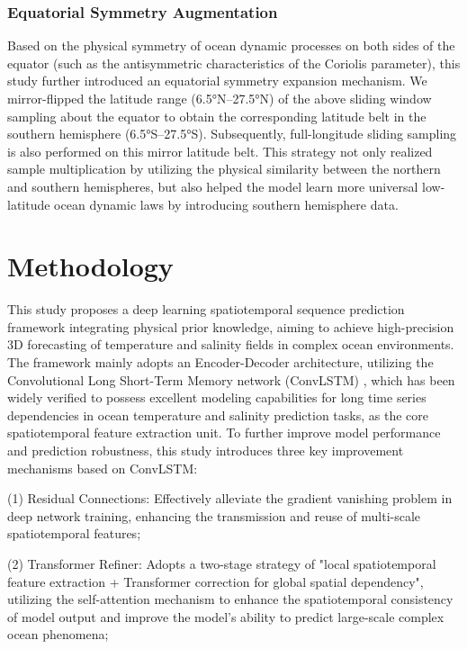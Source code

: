 \documentclass[webpdf,contemporary,large]{oup-authoring-template}
\begin{document}
\subsubsection{Equatorial Symmetry Augmentation}

Based on the physical symmetry of ocean dynamic processes on both sides of the equator (such as the antisymmetric characteristics of the Coriolis parameter), this study further introduced an equatorial symmetry expansion mechanism. We mirror-flipped the latitude range (6.5°N–27.5°N) of the above sliding window sampling about the equator to obtain the corresponding latitude belt in the southern hemisphere (6.5°S–27.5°S). Subsequently, full-longitude sliding sampling is also performed on this mirror latitude belt. This strategy not only realized sample multiplication by utilizing the physical similarity between the northern and southern hemispheres, but also helped the model learn more universal low-latitude ocean dynamic laws by introducing southern hemisphere data.

\section{Methodology}

This study proposes a deep learning spatiotemporal sequence prediction framework integrating physical prior knowledge, aiming to achieve high-precision 3D forecasting of temperature and salinity fields in complex ocean environments. The framework mainly adopts an Encoder-Decoder architecture, utilizing the Convolutional Long Short-Term Memory network (ConvLSTM) \cite{shiConvolutionalLSTMNetwork2015}, which has been widely verified to possess excellent modeling capabilities for long time series dependencies in ocean temperature and salinity prediction tasks, as the core spatiotemporal feature extraction unit. To further improve model performance and prediction robustness, this study introduces three key improvement mechanisms based on ConvLSTM:

(1) Residual Connections: Effectively alleviate the gradient vanishing problem in deep network training, enhancing the transmission and reuse of multi-scale spatiotemporal features;

(2) Transformer Refiner: Adopts a two-stage strategy of "local spatiotemporal feature extraction + Transformer correction for global spatial dependency", utilizing the self-attention mechanism to enhance the spatiotemporal consistency of model output and improve the model's ability to predict large-scale complex ocean phenomena;
\end{document}
